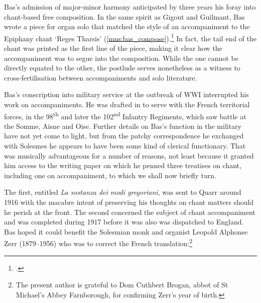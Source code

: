 Bas's admission of major-minor harmony anticipated by three years his foray into chant-based free composition.
In the same spirit as Gigout and Guilmant, Bas wrote a piece for organ solo that matched the style of an accompaniment to the Epiphany chant `Reges Tharsis' (\cref{mus:bas_compose}).\footcite[3]{BasAllaMessaed1915}
In fact, the tail end of the chant was printed as the first line of the piece, making it clear how the accompaniment was to segue into the composition.
While the one cannot be directly equated to the other, the postlude serves nonetheless as a witness to cross-fertilisation between accompaniments and solo literature.

Bas's conscription into military service at the outbreak of WWI interrupted his work on accompaniments.
He was drafted in to serve with the French territorial forces, in the 98\textsuperscript{th} and later the 102\textsuperscript{nd} Infantry Regiments, which saw battle at the Somme, Aisne and Oise.
Further details on Bas's function in the military have not yet come to light, but from the patchy correspondence he exchanged with Solesmes he appears to have been some kind of clerical functionary.
That was musically advantageous for a number of reasons, not least because it granted him access to the writing paper on which he penned three treatises on chant, including one on accompaniment, to which we shall now briefly turn.

The first, entitled \covid{}\emph{La sostanza dei modi gregoriani}, was sent to Quarr around 1916 with the macabre intent of preserving his thoughts on chant matters should he perish at the front.
The second concerned the subject of chant accompaniment and was completed during 1917 before it was also was dispatched to England.
Bas hoped it could benefit the Solesmian monk and organist Leopold Alphonse Zerr (1879--1956) who was to correct the French translation:\footnote{The present author is grateful to Dom Cuthbert Brogan, abbot of St Michael's Abbey Farnborough, for confirming Zerr's year of birth.}

